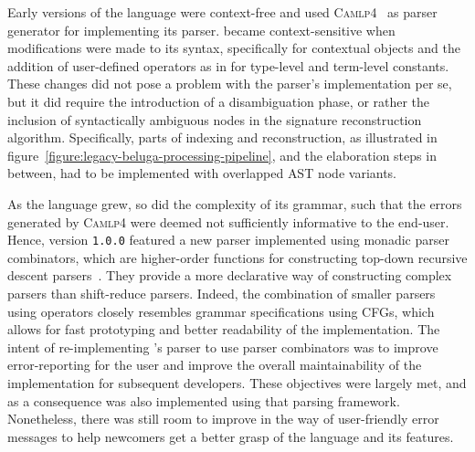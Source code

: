 Early versions of the \Beluga language were context-free and used \textsc{Camlp4}~\cite{de2003camlp4} as parser generator for implementing its parser.
\Beluga became context-sensitive when modifications were made to its syntax, specifically for contextual objects and the addition of user-defined operators as in \Twelf for \LF type-level and term-level constants.
These changes did not pose a problem with the parser's implementation per se, but it did require the introduction of a disambiguation phase, or rather the inclusion of syntactically ambiguous nodes in the signature reconstruction algorithm.
Specifically, parts of indexing and reconstruction, as illustrated in figure~\ref{figure:legacy-beluga-processing-pipeline}, and the elaboration steps in between, had to be implemented with overlapped \ac{AST} node variants.


As the \Beluga language grew, so did the complexity of its grammar, such that the errors generated by \textsc{Camlp4} were deemed not sufficiently informative to the end-user.
Hence, \Beluga version \texttt{1.0.0} featured a new parser implemented using monadic parser combinators, which are higher-order functions for constructing top-down recursive descent parsers~\cite{Burge1975-BURRPT, hutton1996monadic, leijen2001parsec, generalparsercombs}.
They provide a more declarative way of constructing complex parsers than shift-reduce parsers.
Indeed, the combination of smaller parsers using operators closely resembles grammar specifications using \acp{CFG}, which allows for fast prototyping and better readability of the implementation.
The intent of re-implementing \Beluga's parser to use parser combinators was to improve error-reporting for the user and improve the overall maintainability of the implementation for subsequent developers.
These objectives were largely met, and as a consequence \Harpoon was also implemented using that parsing framework.
Nonetheless, there was still room to improve in the way of user-friendly error messages to help newcomers get a better grasp of the language and its features.



